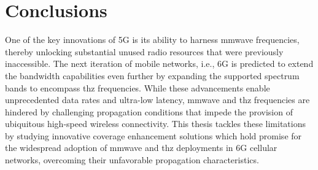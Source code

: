 \chapter{Conclusions}
\label{ch:concl}

One of the key innovations of 5G is its ability to harness \gls{mmwave} frequencies, thereby unlocking substantial unused radio resources that were previously inaccessible. The next iteration of mobile networks, i.e., 6G is predicted to extend the bandwidth capabilities even further by expanding the supported spectrum bands to encompass \gls{thz} frequencies. 
While these advancements enable unprecedented data rates and ultra-low latency, \gls{mmwave} and \gls{thz} frequencies are hindered by challenging propagation conditions that impede the provision of ubiquitous high-speed wireless connectivity.
This thesis tackles these limitations by studying innovative coverage enhancement solutions which hold promise for the widespread adoption of \gls{mmwave} and \gls{thz} deployments in 6G cellular networks, overcoming their unfavorable propagation characteristics.

